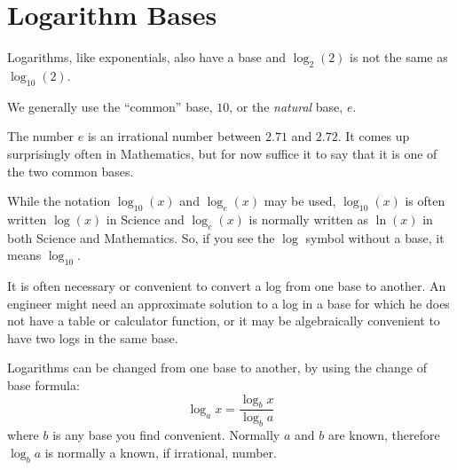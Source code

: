 
\section{Logarithm Bases}
Logarithms, like exponentials, also have a base and $\log_{2}(2)$ is not the same as $\log_{10}(2)$. 

We generally use the ``common'' base, $10$, or the \textit{natural} base, $e$.

The number $e$ is an irrational number between $2.71$ and $2.72$. It comes up surprisingly often in Mathematics, but for now suffice it to say that it is one of the two common bases.


While the notation $\log_{10}(x)$ and $\log_{e}(x)$ may be used, $\log_{10}(x)$ is often written $\log(x)$ in Science and $\log_{e}(x)$ is normally written as $\ln(x)$ in both Science and Mathematics. So, if you see the $\log$ symbol without a base, it means $\log_{10}$.

It is often necessary or convenient to convert a log from one base to another. An engineer might need an approximate solution to a log in a base for which he does not have a table or calculator function, or it may be algebraically convenient to have two logs in the same base.

Logarithms can be changed from one base to another, by using the change of base formula:
\begin{equation}
\label{eq:mf:a:basechange}
\log_{a}x=\frac{\log_{b}x}{\log_{b}a}
\end{equation}
where $b$ is any base you find convenient. Normally $a$ and $b$ are known,
therefore $\log_{b}a$ is normally a known, if irrational, number.

